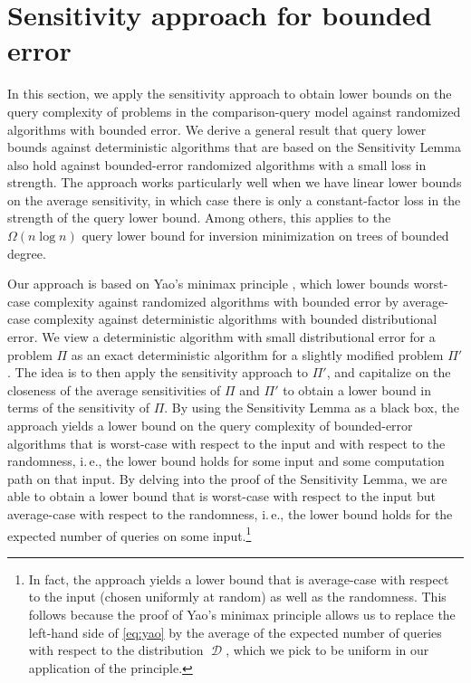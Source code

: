 \documentclass[11pt]{article}
\numberwithin{equation}{section}
\theoremstyle{definition}
\theoremstyle{plain}
\newcommand{\ie}{i.\,e.}
\DeclareMathOperator{\dist}{\mathcal{D}}
\begin{document}
\section{Sensitivity approach for bounded error}
\label{sec:random}

In this section, we apply the sensitivity approach to obtain lower bounds on the query complexity of problems in the comparison-query model against randomized algorithms with bounded error. We derive a general
%
result that query lower bounds against deterministic algorithms that are based on the Sensitivity
%
Lemma also  %
hold against bounded-error randomized algorithms with a small loss in strength. The approach works particularly well when we have linear lower bounds on the average sensitivity, in which case there is only a constant-factor loss in the strength of the query lower bound. Among others, this applies to the $\Omega(n \log n)$ query lower bound for inversion minimization on trees of bounded degree.

%
%

Our approach is based on Yao's minimax principle \cite{Yao77}, which lower bounds worst-case complexity against randomized algorithms with bounded error by average-case complexity against deterministic algorithms with bounded distributional error. We view a deterministic algorithm with small distributional error for a problem $\Pi$ as an exact deterministic algorithm for a slightly modified problem $\Pi'$. The idea is to then apply the sensitivity approach to $\Pi'$, and capitalize on the closeness of the average sensitivities of $\Pi$ and $\Pi'$ to obtain a lower bound in terms of the sensitivity of $\Pi$. By using the Sensitivity Lemma as a %
black box,  %
the approach yields a lower bound on the query complexity of bounded-error algorithms that is worst-case with respect to the input and with respect to the randomness, \ie, the lower bound holds for some input and some computation path on that input. By delving into the proof of the Sensitivity Lemma, we are able to obtain a lower bound that is worst-case with respect to the input but average-case with respect to the randomness, \ie, the lower bound holds for the expected number of queries on some input.\footnote{In fact, the approach yields a lower bound that is average-case with respect to the input (chosen uniformly at random) as well as the randomness. This follows because the proof of Yao's minimax principle allows us to replace the left-hand side of \eqref{eq:yao} by the average of the expected number of queries with respect to the distribution $\dist$, which we pick to be uniform in our application of the principle.}
\end{document}
